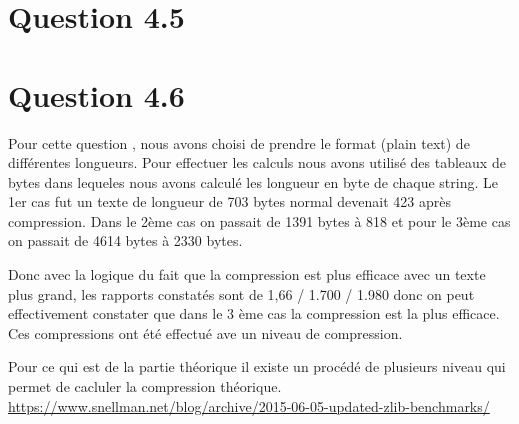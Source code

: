\documentclass[12pt]{article}
\begin{document}
\section*{Question 4.5}


\section*{Question 4.6}
Pour cette question , nous avons choisi de prendre le format (plain text) de différentes longueurs.
Pour effectuer les calculs nous avons utilisé des tableaux de bytes dans lequeles nous avons calculé les longueur en byte de chaque string.
Le 1er cas fut un texte de longueur de 703 bytes normal devenait 423 après compression.
Dans le 2ème cas on passait de 1391 bytes à 818 et pour le 3ème cas on passait de 4614 bytes à 2330 bytes.

Donc avec la logique du fait que la compression est plus efficace avec un texte plus grand,
les rapports constatés sont de 1,66 / 1.700 / 1.980 donc on peut effectivement constater que dans le 3 ème cas la
compression est la plus efficace. Ces compressions ont été effectué ave un niveau de compression.

Pour ce qui est de la partie théorique il existe un procédé de plusieurs niveau qui permet de cacluler la compression théorique.
\newline
\url{https://www.snellman.net/blog/archive/2015-06-05-updated-zlib-benchmarks/}
\end{document}
